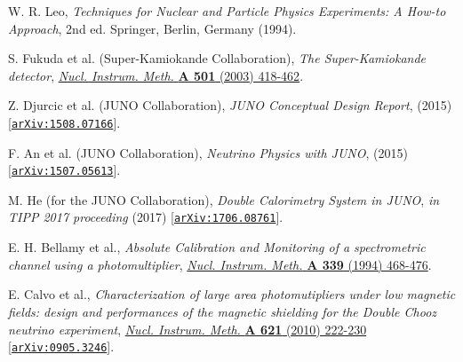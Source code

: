 \documentclass[a4paper,11pt]{article}
\begin{document}
%


%


\begin{thebibliography}{99}
%

 W. R. Leo, \emph{Techniques for Nuclear and Particle Physics Experiments: A How-to Approach}, 2nd ed. Springer, Berlin, Germany (1994).

 S. Fukuda {et al.} (Super-Kamiokande Collaboration), \emph{The Super-Kamiokande detector}, 
\href{https://www.sciencedirect.com/science/article/pii/S016890020300425X}{\emph{Nucl. Instrum. Meth.} {\bf A 501} (2003) 418-462}.

  Z. Djurcic {et al.} (JUNO Collaboration), \emph{JUNO Conceptual Design Report}, (2015) [\href{https://arxiv.org/abs/1508.07166}{\texttt{arXiv:1508.07166}}].

 F. An {et al.} (JUNO Collaboration), \emph{Neutrino Physics with JUNO}, (2015) [\href{https://arxiv.org/abs/1507.05613}{\texttt{arXiv:1507.05613}}]. 

 M. He (for the JUNO Collaboration), \emph{Double Calorimetry System in JUNO}, \emph{in TIPP 2017 proceeding} (2017) [\href{https://arxiv.org/abs/1706.08761}{\texttt{arXiv:1706.08761}}]. 




 E. H. Bellamy {et al.}, \emph{Absolute Calibration and Monitoring of a spectrometric channel using a photomultiplier}, 
\href{https://www.sciencedirect.com/science/article/pii/016890029490183X}{\emph{Nucl. Instrum. Meth.} {\bf A 339} (1994) 468-476}. 




 E. Calvo {et al.}, \emph{Characterization of large area photomutipliers under low magnetic fields: design and performances of the magnetic shielding for the Double Chooz neutrino experiment}, 
\href{https://www.sciencedirect.com/science/article/pii/S016890021001199X}{\emph{Nucl. Instrum. Meth.} {\bf A 621} (2010) 222-230} 
 [\href{https://arxiv.org/abs/0905.3246}{\texttt{arXiv:0905.3246}}]. 


\end{thebibliography}
\end{document}
